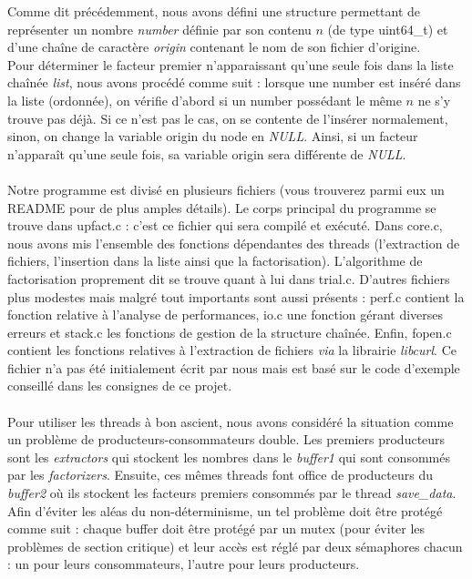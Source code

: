 \documentclass{article}
\begin{document}
Comme dit précédemment, nous avons défini une structure permettant de représenter un nombre \emph{number} définie par son contenu $n$ (de type uint64\_t) et d'une chaîne de caractère \emph{origin} contenant le nom de son fichier d'origine.\\
Pour déterminer le facteur premier n'apparaissant qu'une seule fois dans la liste chaînée \emph{list}, nous avons procédé comme suit : lorsque une number est inséré dans la liste (ordonnée), on vérifie d'abord si un number possédant le même $n$ ne s'y trouve pas déjà. Si ce n'est pas le cas, on se contente de l'insérer normalement, sinon, on change la variable origin du node en \emph{NULL}. Ainsi, si un facteur n'apparaît qu'une seule fois, sa variable origin sera différente de \emph{NULL}.\\
\\
Notre programme est divisé en plusieurs fichiers (vous trouverez parmi eux un README pour de plus amples détails). Le corps principal du programme se trouve dans upfact.c : c'est ce fichier qui sera compilé et exécuté. Dans core.c, nous avons mis l'ensemble des fonctions dépendantes des threads (l'extraction de fichiers, l'insertion dans la liste ainsi que la factorisation). L'algorithme de factorisation proprement dit se trouve quant à lui dans trial.c. D'autres fichiers plus modestes mais malgré tout importants sont aussi présents : perf.c contient la fonction relative à l'analyse de performances, io.c une fonction gérant diverses erreurs et stack.c les fonctions de gestion de la structure chaînée. Enfin, fopen.c contient les fonctions relatives à l'extraction de fichiers \emph{via} la librairie \emph{libcurl}. Ce fichier n'a pas été initialement écrit par nous mais est basé sur le code d'exemple conseillé dans les consignes de ce projet.\\
\\
Pour utiliser les threads à bon ascient, nous avons considéré la situation comme un problème de producteurs-consommateurs double. Les premiers producteurs sont les \emph{extractors} qui stockent les nombres dans le \emph{buffer1} qui sont consommés par les \emph{factorizers}. Ensuite, ces mêmes threads font office de producteurs du \emph{buffer2} où ils stockent les facteurs premiers consommés par le thread \emph{save\_data}. \\
Afin d'éviter les aléas du non-déterminisme, un tel problème doit être protégé comme suit : chaque buffer doit être protégé par un mutex (pour éviter les problèmes de section critique) et leur accès est réglé par deux sémaphores chacun : un pour leurs consommateurs, l'autre pour leurs producteurs.
\end{document}
